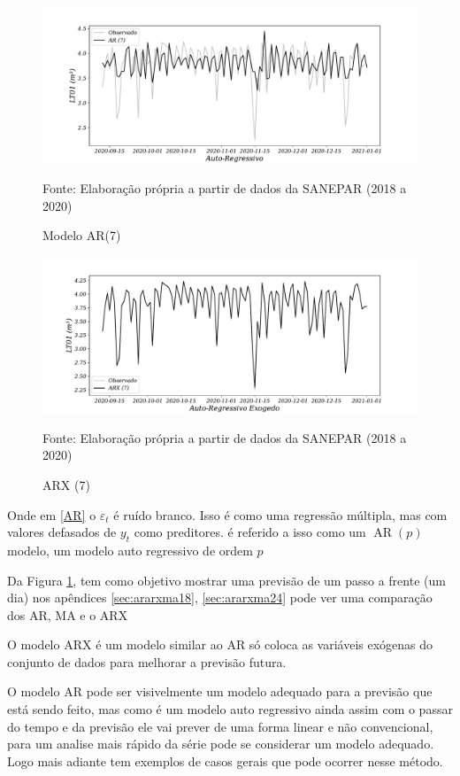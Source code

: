 \begin{figure}[H]
	\centering
	\caption{Modelo AR(7)  }
	\label{fig:1-ar}
	\includegraphics[width=1\linewidth]{Modelos/Figuras/1-AR}
	
	Fonte: Elaboração própria a partir de dados da SANEPAR (2018 a 2020)
\end{figure}

\begin{figure}[H]
	\centering
	\caption{ARX (7)}
	\label{fig:1-arx}
	\includegraphics[width=1\linewidth]{Modelos/Figuras/1-ARX}
	
	Fonte: Elaboração própria a partir de dados da SANEPAR (2018 a 2020)
\end{figure}



Onde em \eqref{AR} o $\varepsilon_t$ é ruído branco. Isso é como uma regressão múltipla, mas com valores defasados de $y_t$ como preditores. é referido a isso como um $\operatorname{AR}(p)$ modelo, um modelo auto regressivo de ordem $p$

Da Figura \ref{fig:1-ar}, tem como objetivo mostrar uma previsão de um passo a frente (um dia) nos apêndices \ref{sec:ararxma18}, \ref{sec:ararxma24} pode ver uma comparação dos AR, MA e o ARX

O modelo ARX é um modelo similar ao AR só coloca as variáveis exógenas do conjunto de dados para melhorar a previsão futura.

O modelo AR pode ser visivelmente um modelo adequado para a previsão que está sendo feito, mas como é um modelo auto regressivo ainda assim com o passar do tempo e da previsão ele vai prever de uma forma linear e não convencional, para um analise mais rápido da série pode se considerar um modelo adequado. Logo mais adiante tem exemplos de casos gerais que pode ocorrer nesse método.

